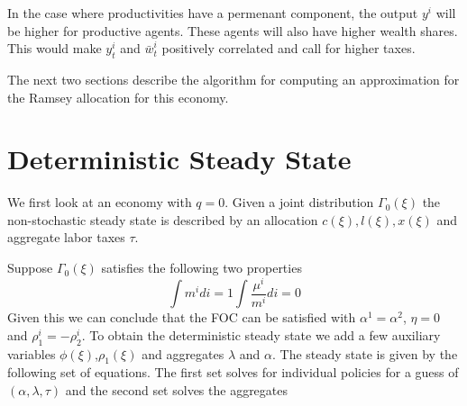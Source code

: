 \documentclass[thmsb,11pt]{article}
\begin{document}
In the case where productivities have a permenant component, the output $y^i$ will be higher for productive agents. These agents will also have higher wealth shares. This would make $y^i_t$ and $\bar{w}^i_t$ positively correlated and call for higher taxes. 

The next two sections describe the  algorithm for computing an approximation for the Ramsey allocation for this economy.

\section{Deterministic Steady State}
We first look at an economy with $q=0$. Given a joint distribution $\Gamma_0(\xi)$ the non-stochastic steady state is described by an allocation $c(\xi), l(\xi), x(\xi)$ and aggregate labor taxes $\tau$. 

Suppose $\Gamma_0(\xi)$ satisfies the following two properties
   \begin{subequations}
   \label{sys-gamma_0_prop}
	\begin{equation}
	\int m^i di=1
	\end{equation}
	\begin{equation}
	\int \frac{\mu^i}{m^i} di=0
	\end{equation}
   \end{subequations}
Given this we can conclude that the FOC can be satisfied with $\alpha^1=\alpha^2$, $\eta=0$ and $\rho^i_{1}=-\rho^i_2$. To obtain the deterministic steady state we add a few auxiliary variables $\phi(\xi)$,$\rho_1(\xi)$ and aggregates $\lambda$ and $\alpha$. The steady state is given by the following set of equations.  The first set solves for individual policies for a guess of $(\alpha,\lambda,\tau)$ and the second set solves the aggregates
\end{document}
